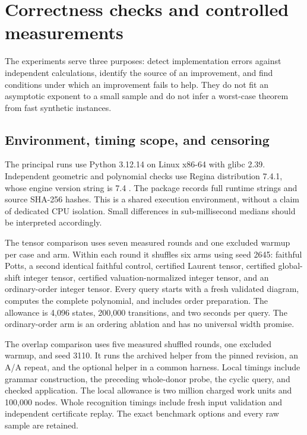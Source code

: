 \section{Correctness checks and controlled measurements}
\label{sec:experiments}

The experiments serve three purposes: detect implementation errors against
independent calculations, identify the source of an improvement, and find
conditions under which an improvement fails to help. They do not fit an
asymptotic exponent to a small sample and do not infer a worst-case theorem
from fast synthetic instances.

\subsection{Environment, timing scope, and censoring}

The principal runs use Python 3.12.14 on Linux x86-64 with glibc 2.39.
Independent geometric and polynomial checks use Regina distribution 7.4.1,
whose engine version string is 7.4 \cite{regina}. The package records full
runtime strings and source SHA-256 hashes. This is a shared execution
environment, without a claim of dedicated CPU isolation. Small differences
in sub-millisecond medians should be interpreted accordingly.

The tensor comparison uses seven measured rounds and one excluded warmup
per case and arm. Within each round it shuffles six arms using seed 2645:
faithful Potts, a second identical faithful control, certified Laurent tensor,
certified global-shift integer tensor, certified valuation-normalized integer
tensor, and an ordinary-order integer tensor. Every query starts with a fresh
validated diagram, computes the complete polynomial, and includes order
preparation. The allowance is 4,096 states, 200,000 transitions, and two
seconds per query. The ordinary-order arm is an ordering ablation and has no
universal width promise.

The overlap comparison uses five measured shuffled rounds, one excluded
warmup, and seed 3110. It runs the archived helper from the pinned revision,
an A/A repeat, and the optional helper in a common harness. Local timings
include grammar construction, the preceding whole-donor probe, the cyclic
query, and checked application. The local allowance is two million charged
work units and 100,000 nodes. Whole recognition timings include fresh input
validation and independent certificate replay. The exact benchmark options
and every raw sample are retained.

